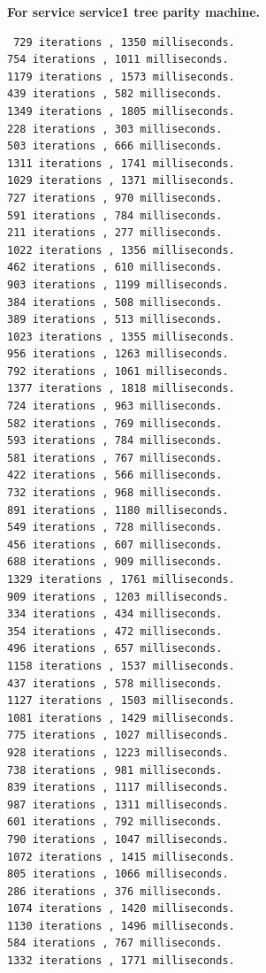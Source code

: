 \textbf{For service service1 tree parity machine.}
\begin{lstlisting}
 729 iterations , 1350 milliseconds.
754 iterations , 1011 milliseconds.
1179 iterations , 1573 milliseconds.
439 iterations , 582 milliseconds.
1349 iterations , 1805 milliseconds.
228 iterations , 303 milliseconds.
503 iterations , 666 milliseconds.
1311 iterations , 1741 milliseconds.
1029 iterations , 1371 milliseconds.
727 iterations , 970 milliseconds.
591 iterations , 784 milliseconds.
211 iterations , 277 milliseconds.
1022 iterations , 1356 milliseconds.
462 iterations , 610 milliseconds.
903 iterations , 1199 milliseconds.
384 iterations , 508 milliseconds.
389 iterations , 513 milliseconds.
1023 iterations , 1355 milliseconds.
956 iterations , 1263 milliseconds.
792 iterations , 1061 milliseconds.
1377 iterations , 1818 milliseconds.
724 iterations , 963 milliseconds.
582 iterations , 769 milliseconds.
593 iterations , 784 milliseconds.
581 iterations , 767 milliseconds.
422 iterations , 566 milliseconds.
732 iterations , 968 milliseconds.
891 iterations , 1180 milliseconds.
549 iterations , 728 milliseconds.
456 iterations , 607 milliseconds.
688 iterations , 909 milliseconds.
1329 iterations , 1761 milliseconds.
909 iterations , 1203 milliseconds.
334 iterations , 434 milliseconds.
354 iterations , 472 milliseconds.
496 iterations , 657 milliseconds.
1158 iterations , 1537 milliseconds.
437 iterations , 578 milliseconds.
1127 iterations , 1503 milliseconds.
1081 iterations , 1429 milliseconds.
775 iterations , 1027 milliseconds.
928 iterations , 1223 milliseconds.
738 iterations , 981 milliseconds.
839 iterations , 1117 milliseconds.
987 iterations , 1311 milliseconds.
601 iterations , 792 milliseconds.
790 iterations , 1047 milliseconds.
1072 iterations , 1415 milliseconds.
805 iterations , 1066 milliseconds.
286 iterations , 376 milliseconds.
1074 iterations , 1420 milliseconds.
1130 iterations , 1496 milliseconds.
584 iterations , 767 milliseconds.
1332 iterations , 1771 milliseconds.

\end{lstlisting}

